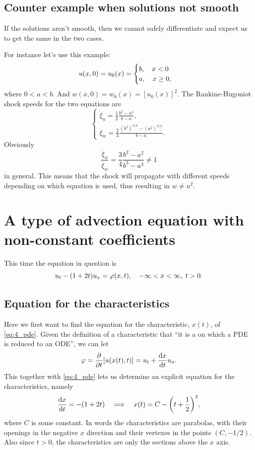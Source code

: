 \documentclass[11pt,letter, swedish, english
]{article}
\begin{document}
\subsection{Counter example when solutions not smooth}
If the solutions aren't smooth, then we cannot safely differentiate
and expect us to get the same in the two cases. 

For instance let's use this example:
\begin{equation}
u(x, 0) = u_0(x) =
\begin{cases}
b\qcomma x<0\\
a\qcomma x\ge0,
\end{cases}
\end{equation}
where $0<a<b$. And $w(x, 0) = w_0(x) = [u_0(x)]^2$. The
Rankine-Hugoniot shock speeds for the two equations are
\begin{equation}
\begin{cases}
\dot\xi_u = \frac{1}{2}\frac{b^2-a^2}{b-a},\\
\dot\xi_w = \frac{2}{3}\frac{(b^2)^{3/2}-(a^2)^{3/2}}{b-a}.
\end{cases}
\end{equation}
Obviously
\begin{equation}
\frac{\dot\xi_u}{\dot\xi_w}=\frac{3}{4}\frac{b^2-a^2}{b^{3}-a^{3}} 
\neq1
\end{equation}
in general. 
This means that the shock will propagate with different speeds
depending on which equation is used, thus resulting in $w\neq u^2$.
 

\section{A type of advection equation with non-constant coefficients}
This time the equation in question is
\begin{equation}\label{eq:4_pde}
u_t - (1+2t)u_x = \varphi(x, t)\qcomma
-\infty<x<\infty,\; t>0.
\end{equation}

\subsection{Equation for the characteristics}
Here we first want to find the equation for the characteristic,
$x(t)$, of \eqref{eq:4_pde}. Given the definition of a characteristic
that ``it is a on which a PDE is reduced to an ODE'', we can let
\begin{equation}
\varphi = \pdv{t}\qty[u(x(t), t)] = u_t + \dv{x}{t}u_x.
\end{equation}
This together with \eqref{eq:4_pde} lets us determine an explicit
equation for the characteristics, namely
\begin{equation}\label{eq:4_char}
\dv{x}{t} = - (1+2t)
\quad\Longrightarrow\quad
x(t) = C - \qty(t + \frac{1}{2})^2,
\end{equation}
where $C$ is some constant. In words the characteristics are parabolas,
with their openings in the negative $x$ direction and their vertexes
in the points $(C, -1/2)$. Also since $t>0$, the characteristics are
only the sections above the $x$ axis. 
\end{document}
